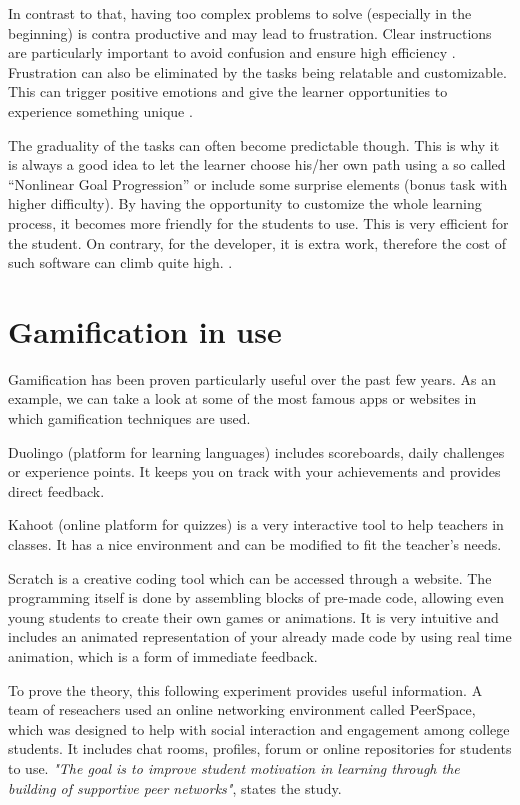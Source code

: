 \documentclass[10pt,english,a4paper]{article}
\begin{document}
	In contrast to that, having too complex problems to solve (especially in the beginning) is contra productive and may lead to frustration. 
	Clear instructions are particularly important to avoid confusion and ensure high efficiency \cite{Raymer}. 
	Frustration can also be eliminated by the tasks being relatable and customizable. 
	This can trigger positive emotions and give the learner opportunities to experience something unique \cite{ AL-Smadi}.
	
	The graduality of the tasks can often become predictable though.
	This is why it is always a good idea to let the learner choose his/her own path using a so called “Nonlinear Goal Progression” or include some surprise elements (bonus task with higher difficulty).
	By having the opportunity to customize the whole learning process, it becomes more friendly for the students to use. 
	This is very efficient for the student. On contrary, for the developer, it is extra work, therefore the cost of such software can climb quite high. \cite{Raymer}.

\section{Gamification in use} \label{section4}
	Gamification has been proven particularly useful over the past few years.
	As an example, we can take a look at some of the most famous apps or websites in which gamification techniques are used.

	Duolingo (platform for learning languages) includes scoreboards, daily challenges or experience points. 
	It keeps you on track with your achievements and provides direct feedback. 
		 
	Kahoot (online platform for quizzes) is a very interactive tool to help teachers in classes. 
	It has a nice environment and can be modified to fit the teacher's needs.
		 
	Scratch is a creative coding tool which can be accessed through a website. 
	The programming itself is done by assembling blocks of pre-made code, allowing even young students to create their own games or animations. 
	It is very intuitive and includes an animated representation of your already made code by using real time animation, which is a form of immediate feedback.

	To prove the theory, this following experiment provides useful information. 
	A team of reseachers used an online networking environment called PeerSpace, which was designed to help with social interaction and engagement among college students.
	It includes chat rooms, profiles, forum or online repositories for students to use. 
	\textit{"The goal is to improve student motivation in learning through the building of supportive peer networks"}, states the study.
	
\end{document}
